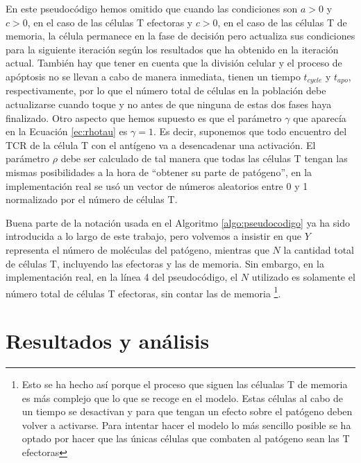 En este pseudocódigo hemos omitido que cuando las condiciones son $a > 0$ y $c > 0$, en el caso de las células T efectoras y $c > 0$, en el caso de las células T de memoria, la célula permanece en la fase de decisión pero actualiza sus condiciones para la siguiente iteración según los resultados que ha obtenido en la iteración actual. También hay que tener en cuenta que la división celular y el proceso de apóptosis no se llevan a cabo de manera inmediata, tienen un tiempo $t_{cycle}$ y $t_{apo}$, respectivamente, por lo que el número total de células en la población debe actualizarse cuando toque y no antes de que ninguna de estas dos fases haya finalizado. Otro aspecto que hemos supuesto es que el parámetro $\gamma$ que aparecía en la Ecuación \ref{ec:rhotau} es $\gamma = 1$. Es decir, suponemos que todo encuentro del TCR de la célula T con el antígeno va a desencadenar una activación. El parámetro $\rho$ debe ser calculado de tal manera que todas las células T tengan las mismas posibilidades a la hora de ``obtener su parte de patógeno'', en la implementación real se usó un vector de números aleatorios entre 0 y 1 normalizado por el número de células T.

Buena parte de la notación usada en el Algoritmo \ref{algo:pseudocodigo} ya ha sido introducida a lo largo de este trabajo, pero volvemos a insistir en que $Y$ representa el número de moléculas del patógeno, mientras que $N$ la cantidad total de células T, incluyendo las efectoras y las de memoria. Sin embargo, en la implementación real, en la línea 4 del pseudocódigo, el $N$ utilizado es solamente el número total de células T efectoras, sin contar las de memoria \footnote{Esto se ha hecho así porque el proceso que siguen las célualas T de memoria es más complejo que lo que se recoge en el modelo. Estas células al cabo de un tiempo se desactivan y para que tengan un efecto sobre el patógeno deben volver a activarse. Para intentar hacer el modelo lo más sencillo posible se ha optado por hacer que las únicas células que combaten al patógeno sean las T efectoras}.

\section{Resultados y análisis}

